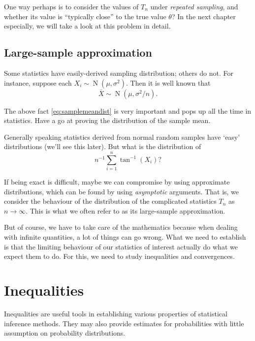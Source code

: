 \documentclass[
]{book}
\DeclareMathOperator{\N}{N}
\theoremstyle{definition}
\theoremstyle{definition}
\theoremstyle{definition}
\theoremstyle{definition}
\theoremstyle{remark}
\begin{document}
One way perhaps is to consider the values of \(T_n\) under \emph{repeated sampling}, and whether its value is ``typically close'' to the true value \(\theta\)?
In the next chapter especially, we will take a look at this problem in detail.

\hypertarget{large-sample-approximation}{%
\subsection{Large-sample approximation}\label{large-sample-approximation}}

Some statistics have easily-derived sampling distribution; others do not.
For instance, suppose each \(X_i\sim\N(\mu,\sigma^2)\). Then it is well known that
\begin{equation}
\bar X \sim \N(\mu, \sigma^2/n). \label{eq:samplemeandist}
\end{equation}

The above fact \eqref{eq:samplemeandist} is very important and pops up all the time in statistics. Have a go at proving the distribution of the sample mean.

Generally speaking statistics derived from normal random samples have `easy' distributions (we'll see this later).
But what is the distribution of
\[
n^{-1}\sum_{i=1}^n \tan^{-1}(X_i)?
\]

If being exact is difficult, maybe we can compromise by using approximate distributions, which can be found by using \emph{asymptotic} arguments.
That is, we consider the behaviour of the distribution of the complicated statistics \(T_n\) as \(n\to\infty\).
This is what we often refer to as its large-sample approximation.

But of course, we have to take care of the mathematics because when dealing with infinite quantities, a lot of things can go wrong.
What we need to establish is that the limiting behaviour of our statistics of interest actually do what we expect them to do.
For this, we need to study inequalities and convergences.

\hypertarget{inequalities}{%
\section{Inequalities}\label{inequalities}}

Inequalities are useful tools in establishing various properties of statistical inference methods.
They may also provide estimates for probabilities with little assumption on probability distributions.
\end{document}
